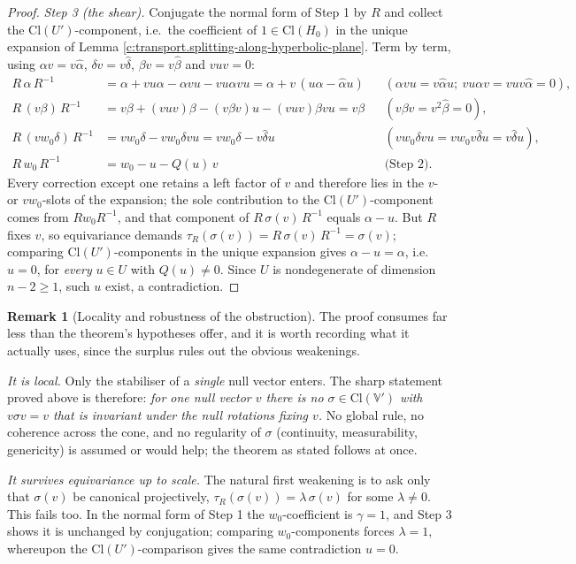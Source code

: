 \documentclass[11pt]{article}
\theoremstyle{definition}
\newtheorem{remark}[theorem]{Remark}
\theoremstyle{plain}
\providecommand{\Cl}{}\renewcommand{\Cl}{\mathrm{Cl}}
\begin{document}
\begin{proof}
\emph{Step 3 (the shear).} Conjugate the normal form of Step 1 by $R$ and collect the $\Cl(U')$-component, i.e.\ the coefficient of $1 \in \Cl(H_0)$ in the unique expansion of Lemma \ref{c:transport.splitting-along-hyperbolic-plane}. Term by term, using $\alpha v = v\hat\alpha$, $\delta v = v \hat\delta$, $\beta v = v\hat\beta$ and $vuv = 0$:
\begin{align*}
R\,\alpha\,R^{-1} &= \alpha + vu\alpha - \alpha vu - vu\alpha vu
= \alpha + v\,(u\alpha - \hat{\alpha}u) && (\alpha vu = v\hat\alpha u;\ vu\alpha v = vuv\hat\alpha = 0),\\
R\,(v\beta)\,R^{-1} &= v\beta + (vuv)\beta - (v\beta v)u - (vuv)\beta vu = v\beta && (v\beta v = v^2\hat\beta = 0),\\
R\,(v w_0 \delta)\,R^{-1} &= v w_0 \delta - v w_0 \delta v u = v w_0 \delta - v\hat{\delta}u && (v w_0 \delta v u = v w_0 v \hat{\delta} u = v \hat\delta u),\\
R\,w_0\,R^{-1} &= w_0 - u - Q(u)\,v && \text{(Step 2)}.
\end{align*}
Every correction except one retains a left factor of $v$ and therefore lies in the $v$- or $vw_0$-slots of the expansion; the sole contribution to the $\Cl(U')$-component comes from $R w_0 R^{-1}$, and that component of $R\,\sigma(v)\,R^{-1}$ equals $\alpha - u$. But $R$ fixes $v$, so equivariance demands $\tau_R(\sigma(v)) = R\,\sigma(v)\,R^{-1} = \sigma(v)$; comparing $\Cl(U')$-components in the unique expansion gives $\alpha - u = \alpha$, i.e.\ $u = 0$, for \emph{every} $u \in U$ with $Q(u) \neq 0$. Since $U$ is nondegenerate of dimension $n - 2 \geq 1$, such $u$ exist, a contradiction.

\end{proof}

\begin{remark}[Locality and robustness of the obstruction]\label{c:note.transport.locality-robustness-obstruction}
The proof consumes far less than the theorem's hypotheses offer, and it is worth recording what it actually uses, since the surplus rules out the obvious weakenings.

\emph{It is local.} Only the stabiliser of a \emph{single} null vector enters. The sharp statement proved above is therefore: \emph{for one null vector $v$ there is no $\sigma \in \Cl(\mathbb{V}')$ with $v\sigma v = v$ that is invariant under the null rotations fixing $v$.} No global rule, no coherence across the cone, and no regularity of $\sigma$ (continuity, measurability, genericity) is assumed or would help; the theorem as stated follows at once.

\emph{It survives equivariance up to scale.} The natural first weakening is to ask only that $\sigma(v)$ be canonical projectively, $\tau_R(\sigma(v)) = \lambda\,\sigma(v)$ for some $\lambda \neq 0$. This fails too. In the normal form of Step 1 the $w_0$-coefficient is $\gamma = 1$, and Step 3 shows it is unchanged by conjugation; comparing $w_0$-components forces $\lambda = 1$, whereupon the $\Cl(U')$-comparison gives the same contradiction $u = 0$.
\end{remark}
\end{document}
